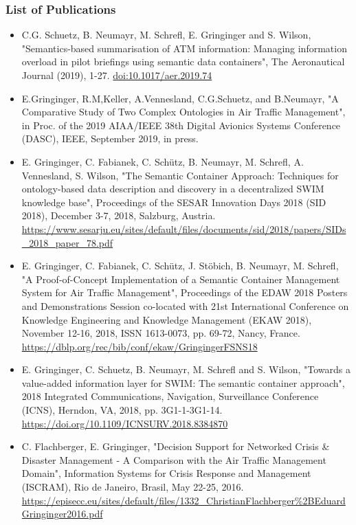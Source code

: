 \documentclass[a4paper,11pt]{article}
\begin{document}
\subsubsection*{List of Publications}

\begin{itemize}
\item C.G. Schuetz, B. Neumayr, M. Schrefl, E. Gringinger and S. Wilson, "Semantics-based summarisation of ATM information: Managing information overload in pilot briefings using semantic data containers", The Aeronautical Journal (2019), 1-27. \url{doi:10.1017/aer.2019.74}
\item E.Gringinger, R.M,Keller, A.Vennesland, C.G.Schuetz, and B.Neumayr, "A Comparative Study of Two Complex Ontologies in Air Traffic Management", in Proc. of the 2019 AIAA/IEEE 38th Digital Avionics Systems Conference (DASC), IEEE, September 2019, in press.
\item E. Gringinger, C. Fabianek, C. Schütz, B. Neumayr, M. Schrefl, A. Vennesland, S. Wilson, "The Semantic Container Approach: Techniques for ontology-based data description and discovery in a decentralized SWIM knowledge base", Proceedings of the SESAR Innovation Days 2018 (SID 2018), December 3-7, 2018, Salzburg, Austria. \url{https://www.sesarju.eu/sites/default/files/documents/sid/2018/papers/SIDs\_2018\_paper\_78.pdf}
\item E. Gringinger, C. Fabianek, C. Schütz, J. Stöbich, B. Neumayr, M. Schrefl, "A Proof-of-Concept Implementation of a Semantic Container Management System for Air Traffic Management", Proceedings of the EDAW 2018 Posters and Demonstrations Session co-located with 21st International Conference on Knowledge Engineering and Knowledge Management (EKAW 2018), November 12-16, 2018, ISSN 1613-0073, pp. 69-72, Nancy, France. \url{https://dblp.org/rec/bib/conf/ekaw/GringingerFSNS18}
\item E. Gringinger, C. Schuetz, B. Neumayr, M. Schrefl and S. Wilson, "Towards a value-added information layer for SWIM: The semantic container approach", 2018 Integrated Communications, Navigation, Surveillance Conference (ICNS), Herndon, VA, 2018, pp. 3G1-1-3G1-14. \url{https://doi.org/10.1109/ICNSURV.2018.8384870}
\item C. Flachberger, E. Gringinger, "Decision Support for Networked Crisis \& Disaster Management - A Comparison with the Air Traffic Management Domain", Information Systems for Crisis Response and Management (ISCRAM), Rio de Janeiro, Brasil, May 22-25, 2016. \url{https://episecc.eu/sites/default/files/1332\_ChristianFlachberger\%2BEduardGringinger2016.pdf}
\end{itemize}
\end{document}
